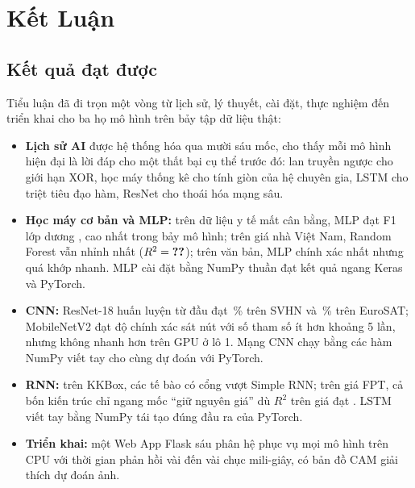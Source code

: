 \chapter*{Kết Luận}
\label{ch:ket-luan}

\section*{Kết quả đạt được}

Tiểu luận đã đi trọn một vòng từ lịch sử, lý thuyết, cài đặt, thực nghiệm đến triển khai cho ba họ mô hình trên bảy tập dữ
liệu thật:
\begin{itemize}
  \item \textbf{Lịch sử AI} được hệ thống hóa qua mười sáu mốc, cho thấy mỗi mô hình hiện đại là lời đáp cho một thất bại cụ
    thể trước đó: lan truyền ngược cho giới hạn XOR, học máy thống kê cho tính giòn của hệ chuyên gia, LSTM cho triệt tiêu
    đạo hàm, ResNet cho thoái hóa mạng sâu.
  \item \textbf{Học máy cơ bản và MLP:} trên dữ liệu y tế mất cân bằng, MLP đạt F1 lớp dương ,
    cao nhất trong bảy mô hình; trên giá nhà Việt Nam, Random Forest vẫn nhỉnh nhất ($R^2 = \SL{ch2_sklearn/house/rf/r2}$);
    trên văn bản, MLP chính xác nhất nhưng quá khớp nhanh. MLP cài đặt bằng NumPy thuần đạt kết quả ngang Keras và PyTorch.
  \item \textbf{CNN:} ResNet-18 huấn luyện từ đầu đạt \,\% trên SVHN và
    \,\% trên EuroSAT; MobileNetV2 đạt độ chính xác sát nút với số tham số ít hơn khoảng
    5 lần, nhưng không nhanh hơn trên GPU ở lô 1. Mạng CNN chạy bằng các hàm NumPy viết tay cho cùng dự đoán với PyTorch.
  \item \textbf{RNN:} trên KKBox, các tế bào có cổng vượt Simple RNN; trên giá FPT, cả bốn kiến trúc chỉ ngang mốc “giữ nguyên
    giá” dù $R^2$ trên giá đạt . LSTM viết tay bằng NumPy tái tạo đúng đầu ra của PyTorch.
  \item \textbf{Triển khai:} một Web App Flask sáu phân hệ phục vụ mọi mô hình trên CPU với thời gian phản hồi vài đến vài
    chục mili-giây, có bản đồ CAM giải thích dự đoán ảnh.
\end{itemize}

